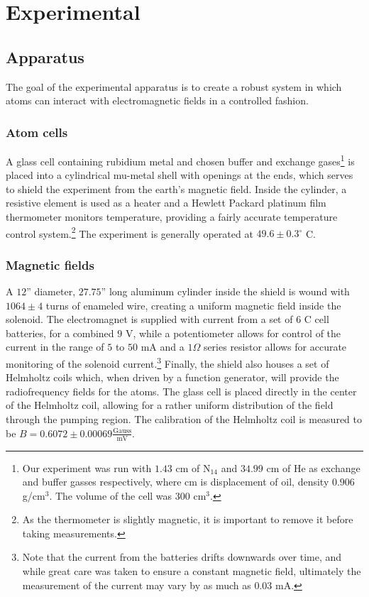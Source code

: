 
\section{Experimental}\label{experimental}

\subsection{Apparatus}\label{apparatus}

The goal of the experimental apparatus is to create a robust system in which atoms can interact with electromagnetic fields in a controlled fashion. 

\subsubsection{Atom cells}
A glass cell containing rubidium metal and chosen buffer and exchange gases\footnote{Our experiment was run with $1.43$ cm of N$_{14}$ and $34.99$ cm of He as exchange and buffer gasses respectively, where cm is displacement of oil, density $0.906$ g/cm$^{3}$. The volume of the cell was $300$ cm$^{3}$.} is placed into a cylindrical mu-metal shell with openings at the ends, which serves to shield the experiment from the earth's magnetic field. Inside the cylinder, a resistive element is used as a heater and a Hewlett Packard platinum film thermometer monitors temperature, providing a fairly accurate temperature control system.\footnote{As the thermometer is slightly magnetic, it is important to remove it before taking measurements.} The experiment is generally operated at $49.6\pm0.3^{\circ}$ C.

\subsubsection{Magnetic fields}

A $12$'' diameter, $27.75$'' long aluminum cylinder inside the shield is wound with $1064\pm4$ turns of enameled wire, creating a uniform magnetic field inside the solenoid. The electromagnet is supplied with current from a set of $6$ C cell batteries, for a combined $9$ V, while a potentiometer allows for control of the current in the range of $5$ to $50$ mA and a $1 \Omega$ series resistor allows for accurate monitoring of the solenoid current.\footnote{Note that the current from the batteries drifts downwards over time, and while great care was taken to ensure a constant magnetic field, ultimately the measurement of the current may vary by as much as $0.03$ mA.} Finally, the shield also houses a set of Helmholtz coils which, when driven by a function generator, will provide the radiofrequency fields for the atoms. The glass cell is placed directly in the center of the Helmholtz coil, allowing for a rather uniform distribution of the field through the pumping region. The calibration of the Helmholtz coil is measured to be $B =0.6072\pm0.00069\frac{\mathrm{Gauss}}{\mathrm{mV}}$.

